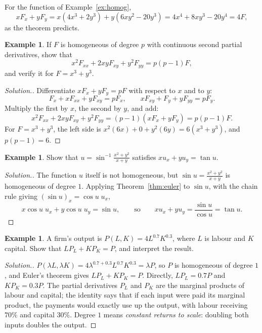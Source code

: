 \documentclass[11pt,a4paper]{article}
\theoremstyle{definition}
\newtheorem{exa}[thm]{Example}
\newenvironment{solution}
  {\renewcommand{\qedsymbol}{}\begin{proof}[\textit{Solution}.]}
  {\end{proof}}
\begin{document}
For the function of Example~\ref{ex:homog},
\[x F_x + y F_y = x(4x^3 + 2y^3) + y(6xy^2 -20y^3) = 4x^4 + 8xy^3 - 20y^4 =
4F,\]
as the theorem predicts.

\begin{exa}
\label{ex:eulersecond}
If $F$ is homogeneous of degree $p$ with continuous second partial derivatives,
show that
\[x^2F_{xx} + 2xyF_{xy} + y^2F_{yy} = p(p-1)F,\]
and verify it for $F = x^3 + y^3$.
\end{exa}

\begin{solution}
Differentiate $xF_x + yF_y = pF$ with respect to $x$ and to $y$:
\[F_x + xF_{xx} + yF_{xy} = pF_x,\qquad xF_{xy} + F_y + yF_{yy} = pF_y .\]
Multiply the first by $x$, the second by $y$, and add:
\[x^2F_{xx} + 2xyF_{xy} + y^2F_{yy} = (p-1)(xF_x + yF_y) = p(p-1)F .\]
For $F = x^3 + y^3$, the left side is $x^2(6x) + 0 + y^2(6y) = 6(x^3 + y^3)$, and
$p(p-1) = 6$.
\end{solution}

\begin{exa}
\label{ex:eulerinverse}
Show that $u = \sin^{-1}\frac{x^2 + y^2}{x + y}$ satisfies
$xu_x + yu_y = \tan u$.
\end{exa}

\begin{solution}
The function $u$ itself is not homogeneous, but $\sin u = \frac{x^2+y^2}{x+y}$ is
homogeneous of degree $1$. Applying Theorem~\ref{thm:euler} to $\sin u$, with
the chain rule giving $(\sin u)_x = \cos u\;u_x$,
\[x\cos u\;u_x + y\cos u\;u_y = \sin u,\qquad\text{so}\qquad xu_x + yu_y =
\frac{\sin u}{\cos u} = \tan u .\]
\end{solution}

\begin{exa}
\label{ex:cobbdouglas}
A firm's output is $P(L,K) = 4L^{0.7}K^{0.3}$, where $L$ is labour and $K$
capital. Show that $LP_L + KP_K = P$, and interpret the result.
\end{exa}

\begin{solution}
$P(\lambda L,\lambda K) = 4\lambda^{0.7 + 0.3}L^{0.7}K^{0.3} = \lambda P$, so $P$
is homogeneous of degree $1$, and Euler's theorem gives $LP_L + KP_K = P$.
Directly, $LP_L = 0.7P$ and $KP_K = 0.3P$. The partial derivatives $P_L$ and $P_K$
are the marginal products of labour and capital; the identity says that if each
input were paid its marginal product, the payments would exactly use up the
output, with labour receiving $70\%$ and capital $30\%$. Degree $1$ means
\emph{constant returns to scale}: doubling both inputs doubles the output.
\end{solution}
\end{document}
